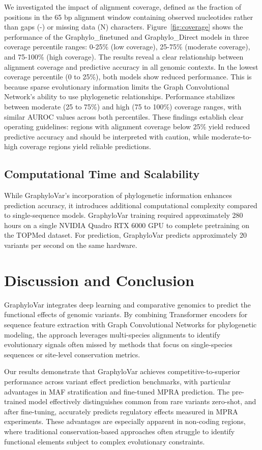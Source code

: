\documentclass[unnumsec,webpdf,contemporary,large]{oup-authoring-template}%
\theoremstyle{thmstyleone}%
\theoremstyle{thmstyletwo}%
\theoremstyle{thmstylethree}%
\begin{document}
We investigated the impact of alignment coverage, defined as the fraction of positions in the 65 bp alignment window containing observed nucleotides rather than gaps (-) or missing data (N) characters.
Figure~\ref{fig:coverage} shows the performance of the Graphylo\_finetuned and Graphylo\_Direct models in three coverage percentile ranges: 0-25\% (low coverage), 25-75\% (moderate coverage), and 75-100\% (high coverage). The results reveal a clear relationship between alignment coverage and predictive accuracy in all genomic contexts.
In the lowest coverage percentile (0 to 25\%), both models show reduced performance. This is because sparse evolutionary information limits the Graph Convolutional Network's ability to use phylogenetic relationships. Performance stabilizes between moderate (25 to 75\%) and high (75 to 100\%) coverage ranges, with similar AUROC values across both percentiles.
These findings establish clear operating guidelines: regions with alignment coverage below 25\% yield reduced predictive accuracy and should be interpreted with caution, while moderate-to-high coverage regions yield reliable predictions.

\subsection{Computational Time and Scalability}
While GraphyloVar's incorporation of phylogenetic information enhances prediction accuracy, it introduces additional computational complexity compared to single-sequence models.
GraphyloVar training required approximately 280 hours on a single NVIDIA Quadro RTX 6000 GPU to complete pretraining on the TOPMed dataset. For prediction, GraphyloVar predicts approximately 20 variants per second on the same hardware.


\section{Discussion and Conclusion}

GraphyloVar integrates deep learning and comparative genomics to predict the functional effects of genomic variants. By combining Transformer encoders for sequence feature extraction with Graph Convolutional Networks for phylogenetic modeling, the approach leverages multi-species alignments to identify evolutionary signals often missed by methods that focus on single-species sequences or site-level conservation metrics.

Our results demonstrate that GraphyloVar achieves competitive-to-superior performance across variant effect prediction benchmarks, with particular advantages in MAF stratification and fine-tuned MPRA prediction. The pre-trained model effectively distinguishes common from rare variants zero-shot, and after fine-tuning, accurately predicts regulatory effects measured in MPRA experiments. These advantages are especially apparent in non-coding regions, where traditional conservation-based approaches often struggle to identify functional elements subject to complex evolutionary constraints.
\end{document}
